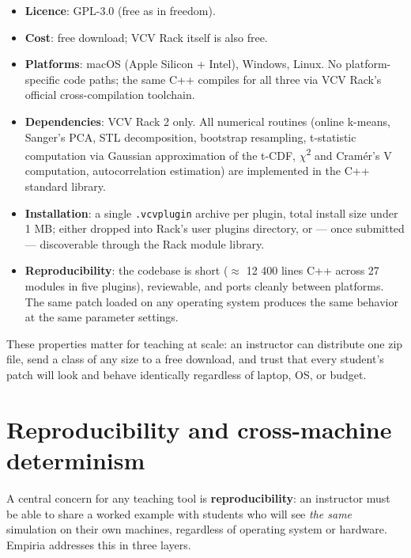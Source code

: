\begin{itemize}
\tightlist
\item
  \textbf{Licence}: GPL-3.0 (free as in freedom).
\item
  \textbf{Cost}: free download; VCV Rack itself is also free.
\item
  \textbf{Platforms}: macOS (Apple Silicon + Intel), Windows, Linux. No
  platform-specific code paths; the same C++ compiles for all three via
  VCV Rack's official cross-compilation toolchain.
\item
  \textbf{Dependencies}: VCV Rack 2 only. All numerical routines (online
  k-means, Sanger's PCA, STL decomposition, bootstrap resampling,
  t-statistic computation via Gaussian approximation of the t-CDF, \ensuremath{\chi}\textsuperscript{2}
  and Cramér's V computation, autocorrelation estimation) are
  implemented in the C++ standard library.
\item
  \textbf{Installation}: a single \texttt{.vcvplugin} archive per
  plugin, total install size under 1 MB; either dropped into Rack's user
  plugins directory, or --- once submitted --- discoverable through the
  Rack module library.
\item
  \textbf{Reproducibility}: the codebase is short (\ensuremath{\approx} 12 400 lines C++
  across 27 modules in five plugins), reviewable, and ports cleanly
  between platforms. The same patch loaded on any operating system
  produces the same behavior at the same parameter settings.
\end{itemize}

These properties matter for teaching at scale: an instructor can
distribute one zip file, send a class of any size to a free download,
and trust that every student's patch will look and behave identically
regardless of laptop, OS, or budget.

\section{Reproducibility and cross-machine
determinism}\label{reproducibility-and-cross-machine-determinism}

A central concern for any teaching tool is \textbf{reproducibility}: an
instructor must be able to share a worked example with students who will
see \emph{the same} simulation on their own machines, regardless of
operating system or hardware. Empiria addresses this in three layers.

